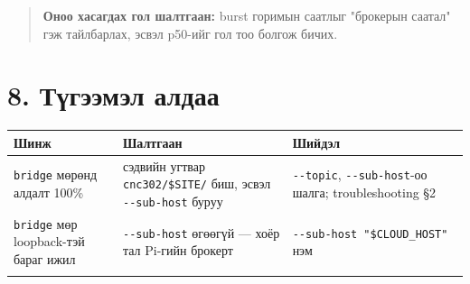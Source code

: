 \begin{quote}
\textbf{Оноо хасагдах гол шалтгаан:} burst горимын саатлыг "брокерын саатал" гэж тайлбарлах, эсвэл p50-ийг гол тоо болгож бичих.
\end{quote}

\hypertarget{ux442ux4afux433ux44dux44dux43cux44dux43b-ux430ux43bux434ux430ux430}{%
\section{8. Түгээмэл алдаа}\label{ux442ux4afux433ux44dux44dux43cux44dux43b-ux430ux43bux434ux430ux430}}

\begingroup\scriptsize\begin{longtable}[]{@{}lll@{}}
\toprule
\begin{minipage}[b]{0.30\columnwidth}\raggedright
Шинж\strut
\end{minipage} & \begin{minipage}[b]{0.30\columnwidth}\raggedright
Шалтгаан\strut
\end{minipage} & \begin{minipage}[b]{0.30\columnwidth}\raggedright
Шийдэл\strut
\end{minipage}\tabularnewline
\midrule
\endhead
\begin{minipage}[t]{0.30\columnwidth}\raggedright
\texttt{bridge} мөрөнд алдалт 100\%\strut
\end{minipage} & \begin{minipage}[t]{0.30\columnwidth}\raggedright
сэдвийн угтвар \texttt{cnc302/\$SITE/} биш, эсвэл \texttt{-\/-sub-host} буруу\strut
\end{minipage} & \begin{minipage}[t]{0.30\columnwidth}\raggedright
\texttt{-\/-topic}, \texttt{-\/-sub-host}-оо шалга; troubleshooting §2\strut
\end{minipage}\tabularnewline
\begin{minipage}[t]{0.30\columnwidth}\raggedright
\texttt{bridge} мөр loopback-тэй бараг ижил\strut
\end{minipage} & \begin{minipage}[t]{0.30\columnwidth}\raggedright
\texttt{-\/-sub-host} өгөөгүй --- хоёр тал Pi-гийн брокерт\strut
\end{minipage} & \begin{minipage}[t]{0.30\columnwidth}\raggedright
\texttt{-\/\allowbreak{}-sub-host\ "\$CLOUD\_\allowbreak{}HOST"} нэм\strut
\end{minipage}\tabularnewline
\begin{minipage}[t]{0.30\columnwidth}\raggedright

\end{minipage}
\end{longtable}
